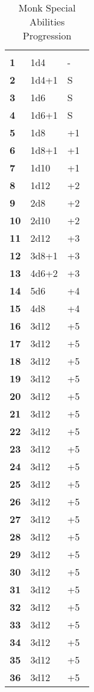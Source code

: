 \begin{multicols*}{2}

\begin {table}[H]
  \caption{Monk Special Abilities Progression}\label{tab:Monk Special Abilities Progression}
  \begin{tabularx}{\columnwidth}{>{\bfseries}YYY}
		 &  & \\
		1 & 1d4 & -\\
		2 & 1d4+1 & S\\
		3 & 1d6 & S\\
		4 & 1d6+1 & S\\
		5 & 1d8 & +1\\
		6 & 1d8+1 & +1\\
		7 & 1d10 & +1\\
		8 & 1d12 & +2\\
		9 & 2d8 & +2\\
		10 & 2d10 & +2\\
		11 & 2d12 & +3\\
		12 & 3d8+1 & +3\\
		13 & 4d6+2 & +3\\
		14 & 5d6 & +4\\
		15 & 4d8 & +4\\
		16 & 3d12 & +5\\
		17 & 3d12 & +5\\
		18 & 3d12 & +5\\
		19 & 3d12 & +5\\
		20 & 3d12 & +5\\
		21 & 3d12 & +5\\
		22 & 3d12 & +5\\
		23 & 3d12 & +5\\
		24 & 3d12 & +5\\
		25 & 3d12 & +5\\
		26 & 3d12 & +5\\
		27 & 3d12 & +5\\
		28 & 3d12 & +5\\
		29 & 3d12 & +5\\
		30 & 3d12 & +5\\
		31 & 3d12 & +5\\
		32 & 3d12 & +5\\
		33 & 3d12 & +5\\
		34 & 3d12 & +5\\
		35 & 3d12 & +5\\
		36 & 3d12 & +5\
  \end {tabularx}
\end {table}


\end{multicols*}

